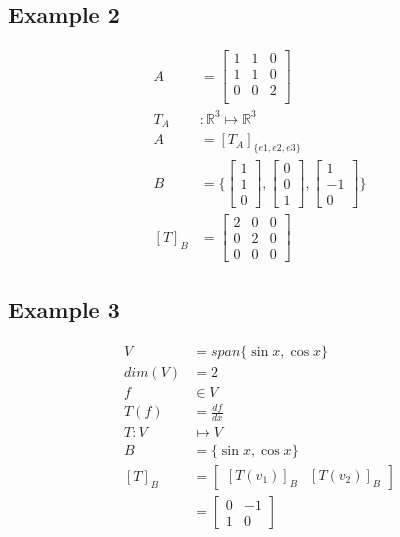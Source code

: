 \documentclass{article}
\theoremstyle{mytheoremstyle}
\theoremstyle{mytheoremstyle}
\theoremstyle{myproblemstyle}
\begin{document}
    \subsection*{Example 2}
    \begin{align*}
        A &= \begin{bmatrix}
            1 & 1 & 0 \\
            1 & 1 & 0 \\
            0 & 0 & 2 \\
        \end{bmatrix} \\
        T_{A}&: \mathbb{R}^3 \mapsto \mathbb{R}^3 \\
        A &= [T_A]_{\{e1,e2,e3\}} \\
        B &= \Bigg\{ \begin{bmatrix}
            1 \\ 1 \\ 0
        \end{bmatrix}, \begin{bmatrix}
            0 \\ 0 \\ 1
        \end{bmatrix}, \begin{bmatrix}
            1 \\ -1 \\ 0
        \end{bmatrix}
        \Bigg\} \\
        [T]_B &= \begin{bmatrix}
            2 & 0 & 0 \\
            0 & 2 & 0 \\
            0 & 0 & 0
        \end{bmatrix}
    \end{align*}

    \subsection*{Example 3}
    \begin{align*}
        V &= span\{\sin x, \cos x\} \\
        dim(V) &= 2 \\
        f &\in V \\
        T(f) &= \frac{df}{dx} \\
        T: V &\mapsto V \\
        B &= \{\sin x, \cos x\} \\
        [T]_B &= \begin{bmatrix}
            [T(v_1)]_B & [T(v_2)]_B
        \end{bmatrix} \\
        &= \begin{bmatrix}
            0 & -1 \\
            1 & 0
        \end{bmatrix}
    \end{align*}
\end{document}
